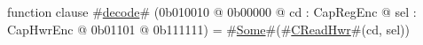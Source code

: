 function clause #\hyperref[sailMIPSzdecode]{decode}# (0b010010 @ 0b00000 @ cd : CapRegEnc @ sel : CapHwrEnc @   0b01101 @ 0b111111) = #\hyperref[sailMIPSzSome]{Some}#(#\hyperref[sailMIPSzCReadHwr]{CReadHwr}#(cd, sel))

